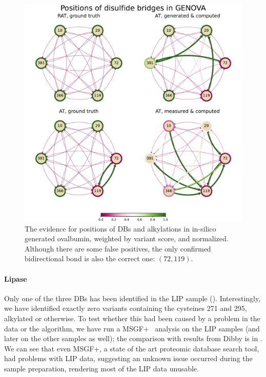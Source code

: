\begin{figure}
  \centering
  \includegraphics[width=0.8\linewidth]{img/genova.pdf}
  \caption{The evidence for positions of DBs and alkylations in in-silico generated ovalbumin, weighted by variant score, and normalized. Although there are some false positives, the only confirmed bidirectional bond is also the correct one: \((72, 119)\).}\label{fig:genova}
\end{figure}

\paragraph{Lipase} Only one of the three DBs has been identified in the LIP sample (). Interestingly, we have identified exactly zero variants containing the cysteines 271 and 295, alkylated or otherwise. To test whether this had been caused by a problem in the data or the algorithm, we have run a MSGF+~\cite{kim2014ms} analysis on the LIP samples (and later on the other samples as well); the comparison with results from Dibby is in . We can see that even MSGF+, a state of the art proteomic database search tool, had problems with LIP data, suggesting an unknown issue occurred during the sample preparation, rendering most of the LIP data unusable.

